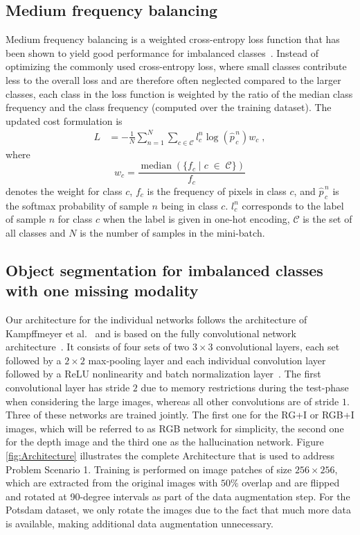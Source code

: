 \documentclass[journal]{IEEEtran}
\DeclareMathOperator{\med}{median}
\begin{document}
\subsection{Medium frequency balancing}
\label{sec:mfb}
Medium frequency balancing is a weighted cross-entropy loss function that has been shown to yield good performance for imbalanced classes~\cite{eigen2015predicting, badrinarayanan2015segnet, kampffmeyer2016semantic}. Instead of optimizing the commonly used cross-entropy loss, where small classes contribute less to the overall loss and are therefore often neglected compared to the larger classes, each class in the loss function is weighted by the ratio of the median class frequency and the class frequency (computed over the training dataset). The updated cost formulation is
\begin{align}
    L &= -\frac{1}{N} \sum_{n=1}^N \sum_{c\in\mathcal{C}} l_{c}^{n}\log\left(\widehat{p}_{\,c}^{\,n}\right) w_{c} \; ,
\end{align}  
where
\begin{equation}
w_{c} = \frac{\med\left(\{f_c\;  | \; c \;\in\; \mathcal{C}\}\right)}{f_c}
\end{equation}
denotes the weight for class $c$, $f_c$ is the frequency of pixels in class $c$, and $\widehat{p}_{\,c}^{\,n}$ is the softmax probability of sample $n$ being in class $c$. $l_{c}^{n}$ corresponds to the label of sample $n$ for class $c$ when the label is given in one-hot encoding, $\mathcal{C}$ is the set of all classes and $N$ is the number of samples in the mini-batch.

\subsection{Object segmentation for imbalanced classes with one missing modality}
\label{sec:obj_seg}
Our architecture for the individual networks follows the architecture of Kampffmeyer et al.~\cite{kampffmeyer2016semantic} and is based on the fully convolutional network architecture~\cite{long2015fully}. It consists of four sets of two $3\times3$ convolutional layers, each set followed by a $2\times2$ max-pooling layer and each individual convolution layer followed by a ReLU nonlinearity and batch normalization layer~\cite{ioffe2015batch}. The first convolutional layer has stride $2$ due to memory restrictions during the test-phase when considering the large images, whereas all other convolutions are of stride $1$. Three of these networks are trained jointly. The first one for the RG+I or RGB+I images, which will be referred to as RGB network for simplicity, the second one for the depth image and the third one as the hallucination network. Figure \ref{fig:Architecture} illustrates the complete Architecture that is used to address Problem Scenario 1. Training is performed on image patches of size $256\times256$, which are extracted from the original images with $50\%$ overlap and are flipped and rotated at 90-degree intervals as part of the data augmentation step. For the Potsdam dataset, we only rotate the images due to the fact that much more data is available, making additional data augmentation unnecessary.
\end{document}
